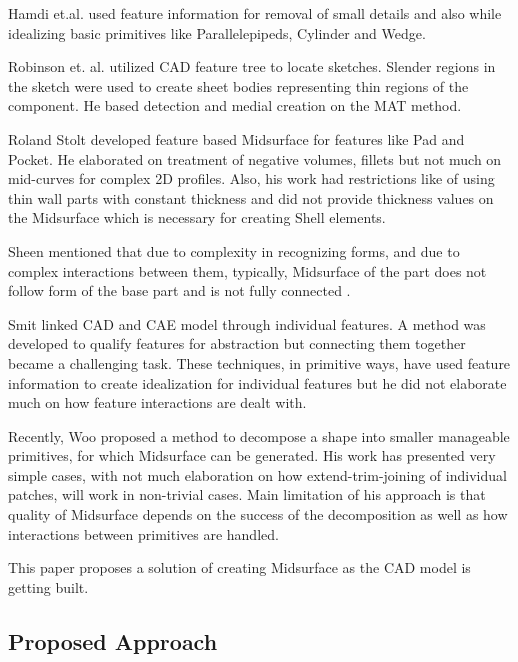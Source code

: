 Hamdi et.al. \citep{Hamdi2005} used feature information for removal of small details and also while idealizing basic primitives like Parallelepipeds, Cylinder and Wedge. 

Robinson et. al.  \citep{Robinson2006} utilized CAD feature tree to locate sketches. Slender regions in the sketch were used to create sheet bodies representing thin regions of the component. He based detection and medial creation on the MAT method. 

Roland Stolt \citep{Stolt2005, Sunnersjo2005, Stolt2006} developed feature based Midsurface for features like Pad and Pocket. He  elaborated on treatment of negative volumes, fillets but not much on mid-curves for complex 2D profiles. Also, his work had restrictions like of using thin wall parts with constant thickness and did not provide thickness values on the Midsurface which is necessary for creating Shell elements. 

Sheen  \citep{Sheen2008} mentioned that due to complexity in recognizing forms, and due to complex interactions between them, typically, Midsurface of the part does not follow form of the base part and is not fully connected . 

Smit \citep{Smit2011} linked CAD and CAE model through individual features. A method was developed to qualify features for abstraction but connecting them together became a challenging task. These techniques, in primitive ways, have used feature information to create idealization for individual features but he did not elaborate much on how feature interactions are dealt with.

Recently, Woo \citep{Woo2013} proposed a method to decompose a  shape into smaller manageable primitives, for which Midsurface can be generated. His work has presented very simple cases, with not much elaboration on how extend-trim-joining of individual patches, will work in non-trivial cases. Main limitation of his approach is that quality of Midsurface depends on the success of the decomposition as well as how interactions between primitives are handled.

This paper proposes a solution of creating Midsurface as the CAD model is getting built.



\subsection{Proposed Approach}

